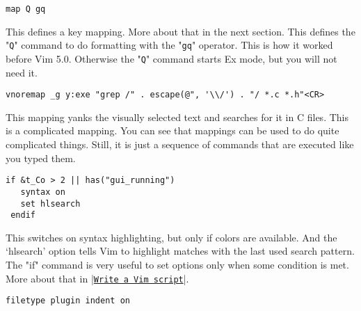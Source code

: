  \begin{Verbatim}[samepage=true]
 map Q gq
 \end{Verbatim}

This defines a key mapping.
More about that in the next section.
This defines the "\texttt{Q}" command to do formatting with the "\texttt{gq}" operator.
This is how it worked before Vim 5.0.
Otherwise the "\texttt{Q}" command starts Ex mode, but you will not need it.

 \begin{Verbatim}[samepage=true]
 vnoremap _g y:exe "grep /" . escape(@", '\\/') . "/ *.c *.h"<CR>
 \end{Verbatim}

This mapping yanks the visually selected text and searches for it in C files.
This is a complicated mapping.
You can see that mappings can be used to do quite complicated things.
Still, it is just a sequence of commands that are executed like you typed them.

 \begin{Verbatim}[samepage=true]
 if &t_Co > 2 || has("gui_running")
   syntax on
   set hlsearch
 endif
 \end{Verbatim}

This switches on syntax highlighting, but only if colors are available.
And the `hlsearch' option tells Vim to highlight matches with the last used search pattern.
The "if" command is very useful to set options only when some condition is met.
More about that in |\hyperref[Write a Vim script]{\texttt{Write a Vim script}}|.
\label{vimrc-filetype}
 \begin{Verbatim}[samepage=true]
 filetype plugin indent on
 \end{Verbatim}


